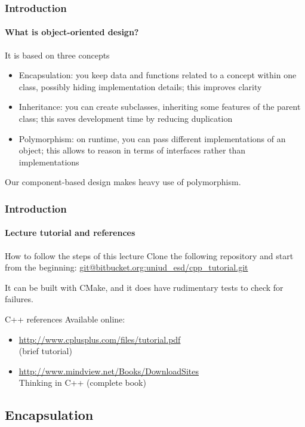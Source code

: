 \begin{frame}
\frametitle{Introduction}
\framesubtitle{What is object-oriented design?}

\begin{block}{It is based on three concepts}
\begin{itemize}
\item Encapsulation: you keep data and functions related to a concept within one class, possibly hiding implementation details; this improves clarity
\item Inheritance: you can create subclasses, inheriting some features of the parent class; this saves development time by reducing duplication
\item Polymorphism: on runtime, you can pass different implementations of an object; this allows to reason in terms of interfaces rather than implementations
\end{itemize}
Our component-based design makes heavy use of polymorphism.
\end{block}

\end{frame}

\begin{frame}
\frametitle{Introduction}
\framesubtitle{Lecture tutorial and references}

\begin{block}{How to follow the steps of this lecture}
Clone the following repository and start from the beginning:
\url{git@bitbucket.org:uniud_esd/cpp_tutorial.git}
\medskip 

It can be built with CMake, and it does have rudimentary tests to check for failures.
\end{block}
\pause
\begin{block}{C++ references}
Available online:
\begin{itemize}
\item \url{http://www.cplusplus.com/files/tutorial.pdf} \\ (brief tutorial)
\item \url{http://www.mindview.net/Books/DownloadSites} \\ Thinking in C++ (complete book)
\end{itemize}
\end{block}

\end{frame}

\subsection{Encapsulation}

